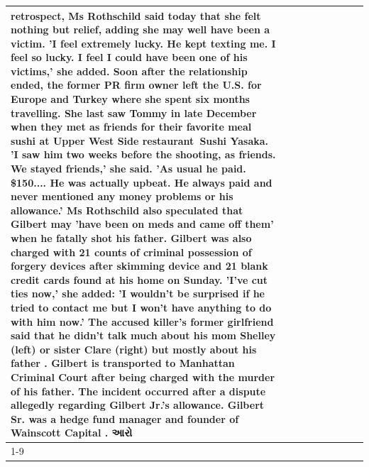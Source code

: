 \begin{table}[H]
\begin{tabular}{lllrlllll}
retrospect, Ms Rothschild said today that she felt nothing but relief, adding she may well have been a victim. 'I feel extremely lucky. He kept texting me. I feel so lucky. I feel I could have been one of his victims,' she added. Soon after the relationship ended, the former PR firm owner left the U.S. for Europe and Turkey where she spent six months  travelling. She last saw Tommy in late December when they met as friends for their favorite meal sushi at Upper West Side restaurant Sushi Yasaka. 'I saw him two weeks before the shooting, as friends. We stayed friends,' she said. 'As usual he paid. \$150.... He was actually upbeat. He always paid and never mentioned any money problems or his allowance.' Ms Rothschild also speculated that Gilbert may 'have been on meds and came off them' when he fatally shot his father. Gilbert was also charged with 21 counts of criminal possession of forgery devices after skimming device and 21 blank credit cards found at his home on Sunday. 'I've cut ties now,' she added: 'I wouldn’t be surprised if he tried to contact me but I won’t have anything to do with him now.' The accused killer's former girlfriend said that he didn't talk much about his mom Shelley (left) or sister Clare (right) but mostly about his father . Gilbert is transported to Manhattan Criminal Court  after being charged with the murder of his father. The incident occurred after a dispute allegedly regarding Gilbert Jr.'s allowance. Gilbert Sr. was a hedge fund manager and founder of Wainscott Capital . આરો \\
\cline{1-9}

\end{tabular}
\end{table}
